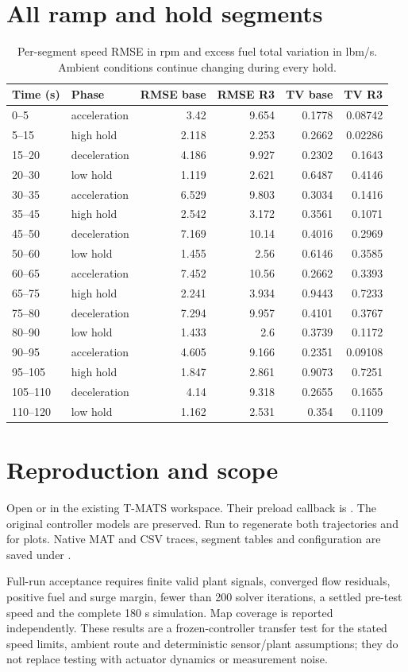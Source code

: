 \documentclass[11pt,a4paper]{article}
\begin{document}
\section{All ramp and hold segments}
\begin{table}[H]\centering\small\begin{tabular}{llrrrr}\toprule
Time (s) & Phase & RMSE base & RMSE R3 & TV base & TV R3\\\midrule
0--5 & acceleration & 3.42 & 9.654 & 0.1778 & 0.08742\\
5--15 & high hold & 2.118 & 2.253 & 0.2662 & 0.02286\\
15--20 & deceleration & 4.186 & 9.927 & 0.2302 & 0.1643\\
20--30 & low hold & 1.119 & 2.621 & 0.6487 & 0.4146\\
30--35 & acceleration & 6.529 & 9.803 & 0.3034 & 0.1416\\
35--45 & high hold & 2.542 & 3.172 & 0.3561 & 0.1071\\
45--50 & deceleration & 7.169 & 10.14 & 0.4016 & 0.2969\\
50--60 & low hold & 1.455 & 2.56 & 0.6146 & 0.3585\\
60--65 & acceleration & 7.452 & 10.56 & 0.2662 & 0.3393\\
65--75 & high hold & 2.241 & 3.934 & 0.9443 & 0.7233\\
75--80 & deceleration & 7.294 & 9.957 & 0.4101 & 0.3767\\
80--90 & low hold & 1.433 & 2.6 & 0.3739 & 0.1172\\
90--95 & acceleration & 4.605 & 9.166 & 0.2351 & 0.09108\\
95--105 & high hold & 1.847 & 2.861 & 0.9073 & 0.7251\\
105--110 & deceleration & 4.14 & 9.318 & 0.2655 & 0.1655\\
110--120 & low hold & 1.162 & 2.531 & 0.354 & 0.1109\\
\bottomrule\end{tabular}\caption{Per-segment speed RMSE in rpm and excess fuel total variation in lbm/s. Ambient conditions continue changing during every hold.}\end{table}
\section{Reproduction and scope}
Open  or  in the existing T-MATS workspace. Their preload callback is . The original controller models are preserved. Run  to regenerate both trajectories and  for plots. Native MAT and CSV traces, segment tables and configuration are saved under .

Full-run acceptance requires finite valid plant signals, converged flow residuals, positive fuel and surge margin, fewer than 200 solver iterations, a settled pre-test speed and the complete 180 s simulation. Map coverage is reported independently. These results are a frozen-controller transfer test for the stated speed limits, ambient route and deterministic sensor/plant assumptions; they do not replace testing with actuator dynamics or measurement noise.
\end{document}
